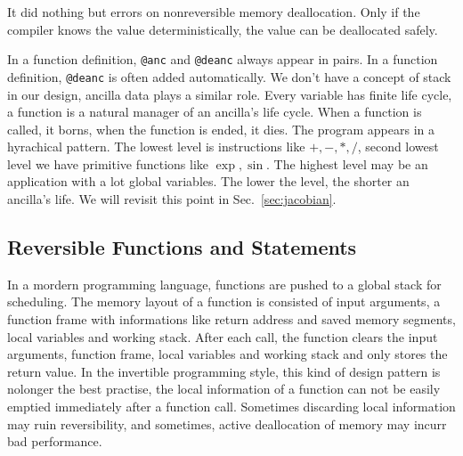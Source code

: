 \documentclass[aps,twocolumn,longbibliography,english,superscriptaddress,prr]{revtex4-1}
\newcommand{\<}{\langle}
\renewcommand{\>}{\rangle}
\newcommand{\Sec}[1]{Sec.~\ref{#1}}
\begin{document}
It did nothing but errors on nonreversible memory deallocation. Only if the compiler knows the value deterministically, the value can be deallocated safely.

In a function definition, \texttt{@anc} and \texttt{@deanc} always appear in pairs. In a function definition, \texttt{@deanc} is often added automatically.
We don't have a concept of stack in our design, ancilla data plays a similar role. Every variable has finite life cycle, a function is a natural manager of an ancilla's life cycle. When a function is called, it borns, when the function is ended, it dies.
The program appears in a hyrachical pattern. The lowest level is instructions like $+, -, *, /$, second lowest level we have primitive functions like $\exp, \sin$. The highest level may be an application with a lot global variables.
The lower the level, the shorter an ancilla's life. We will revisit this point in \Sec{sec:jacobian}.

\subsection{Reversible Functions and Statements}
In a mordern programming language, functions are pushed to a global stack for scheduling. The memory layout of a function is consisted of input arguments, a function frame with informations like return address and saved memory segments, local variables and working stack. After each call, the function clears the input arguments, function frame, local variables and working stack and only stores the return value.
In the invertible programming style, this kind of design pattern is nolonger the best practise, the local information of a function can not be easily emptied immediately after a function call. Sometimes discarding local information may ruin reversibility, and sometimes, active deallocation of memory may incurr bad performance.
\end{document}

